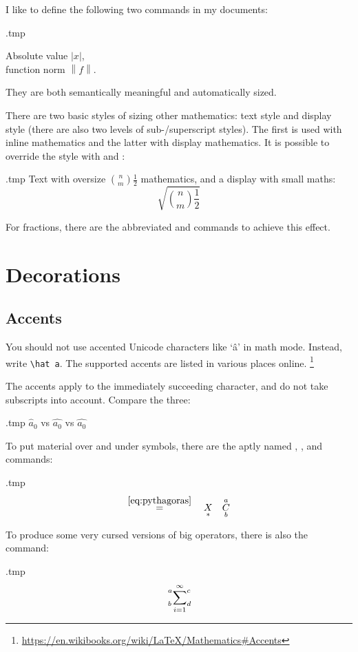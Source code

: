 \begin{practices}
I like to define the following two commands in my documents:
%
\begin{VerbatimOut}{\jobname.tmp}
\newcommand{\abs}[1]{\left|#1\right|}
\newcommand{\norm}[1]{\left\|#1\right\|}

Absolute value $\abs x$,\\
function norm $\norm f$.
\end{VerbatimOut}
\ShowExample
%
They are both semantically meaningful and automatically sized.
\end{practices}

There are two basic styles of sizing other mathematics: text style and display style
(there are also two levels of sub-/superscript styles).
The first is used with inline mathematics and the latter with display mathematics.
It is possible to override the style with  and :
%
\begin{VerbatimOut}{\jobname.tmp}
Text with oversize
$\displaystyle \binom n m \frac 1 2$
mathematics, and a display with small maths:
\[
\sqrt{\textstyle \binom n m \frac 1 2}
\]
\end{VerbatimOut}
\ShowExample
%
For fractions, there are the abbreviated  and  commands
to achieve this effect.


%
%
%
\section{Decorations}

\subsection{Accents}

You should not use accented Unicode characters like `â' in math mode.
Instead, write \verb|\hat a|.
The supported accents are listed in various places online.%
\footnote{\url{https://en.wikibooks.org/wiki/LaTeX/Mathematics\#Accents}}

\begin{gotcha}
The accents apply to the immediately succeeding character,
and do not take subscripts into account.
Compare the three:
%
\begin{VerbatimOut}{\jobname.tmp}
$\hat a_0$ vs $\hat {a_0}$
vs $\widehat {a_0}$
\end{VerbatimOut}
\ShowExample
\end{gotcha}

To put material over and under symbols,
there are the aptly named , , and  commands:
%
\begin{VerbatimOut}{\jobname.tmp}
\[
\overset{\eqref{eq:pythagoras}}{=}
\quad \underset{\ast}{X}
\quad \overunderset{a}{b}{C}
\]
\end{VerbatimOut}
\ShowExample
%
To produce some very cursed versions of big operators,
there is also the  command:
%
\begin{VerbatimOut}{\jobname.tmp}
\[
\sideset{^a_b}{^c_d}\sum_{i=1}^\infty
\]
\end{VerbatimOut}
\ShowExample



